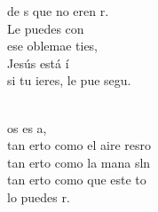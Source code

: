 \begin{cancion}
	de s que no eren r.\\
	Le puedes con\\
	ese oblemae ties,\\
	Jesús está í\\
	si tu ieres, le pue segu.\\\jump\\
	\begin{chorus}%
	os es a, \\
	tan erto como el aire  resro\\
	tan erto como la mana sln\\
	tan erto como que este to \\
	lo puedes r. \\
	\end{chorus}%
	\jump\\
\end{cancion}%
